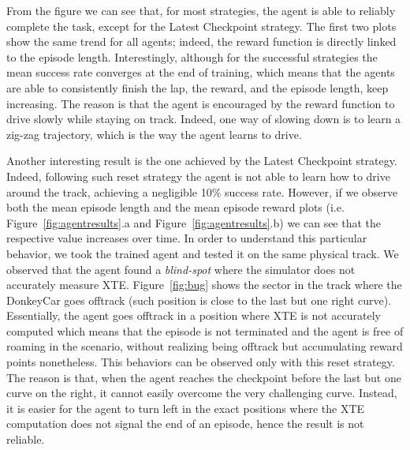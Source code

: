 
From the figure we can see that, for most strategies, the agent is able to reliably complete the task, except for the Latest Checkpoint strategy. The first two plots show the same trend for all agents; indeed, the reward function is directly linked to the episode length. Interestingly, although for the successful strategies the mean success rate converges at the end of training, which means that the agents are able to consistently finish the lap, the reward, and the episode length, keep increasing. The reason is that the agent is encouraged by the reward function to drive slowly while staying on track. Indeed, one way of slowing down is to learn a zig-zag trajectory, which is the way the agent learns to drive. 

Another interesting result is the one achieved by the Latest Checkpoint strategy. Indeed, following such reset strategy the agent is not able to learn how to drive around the track, achieving a negligible 10\% success rate. However, if we observe both the mean episode length and the mean episode reward plots (i.e. Figure~\ref{fig:agentresults}.a and Figure~\ref{fig:agentresults}.b) we can see that the respective value increases over time. In order to understand this particular behavior, we took the trained agent and tested it on the same physical track. We observed that the agent found a \textit{blind-spot} where the simulator does not accurately measure XTE. Figure~\ref{fig:bug} shows the sector in the track where the DonkeyCar goes offtrack (such position is close to the last but one right curve). Essentially, the agent goes offtrack in a position where XTE is not accurately computed which means that the episode is not terminated and the agent is free of roaming in the scenario, without realizing being offtrack but accumulating reward points nonetheless. This behaviors can be observed only with this reset strategy. The reason is that, when the agent reaches the checkpoint before the last but one curve on the right, it cannot easily overcome the very challenging curve. Instead, it is easier for the agent to turn left in the exact positions where the XTE computation does not signal the end of an episode, hence the result is not reliable. 

